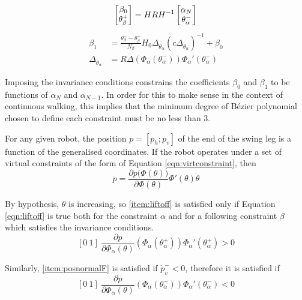 \begin{equation} \label{eqn:bezinvconfig}
	\begin{bmatrix}
	 \beta_0 \\ \theta_\beta^+
	\end{bmatrix}
	= HRH^{-1} \begin{bmatrix}
		\alpha_N \\ \theta_\alpha^-
	\end{bmatrix} \\
\end{equation}
\begin{subequations} \label{eqn:bezinvvel}
\begin{align}
	\beta_1 &= \frac{\theta_\beta^- - \theta_\beta^+}{N_\beta}
	H_0\Delta_{\dot{\theta}_\alpha} \left(c\Delta_{\dot{\theta}_\alpha}\right)^{-1} + \beta_0\\
	\Delta_{\dot{\theta}_\alpha} &= R\Delta\left(\Phi_\alpha\left(\theta_\alpha^-\right)\right)
		\Phi_\alpha'\left(\theta_\alpha^-\right)
\end{align}
\end{subequations}

Imposing the invariance conditions constrains the coefficients $\beta_0$ and $\beta_1$ to be functions of $\alpha_N$ and $\alpha_{N-1}$. In order for this to make sense in the context of continuous walking, this implies that the minimum degree of Bézier polynomial chosen to define each constraint must be no less than 3.

For any given robot, the position $p=[p_h;p_v]$ of the end of the swing leg is a function of the generalised coordinates. If the robot operates under a set of virtual constraints of the form of Equation \ref{eqn:virtconstraint}, then
\begin{equation*}
	\dot{p} = \frac{\partial p\Big(\Phi(\theta)\Big)}{\partial\Phi(\theta)}
	\Phi'(\theta)\dot{\theta}
\end{equation*}

By hypothesis, $\theta$ is increasing, so \ref{item:liftoff} is satisfied only if Equation \ref{eqn:liftoff} is true both for the constraint $\alpha$ and for a following constraint $\beta$ which satisfies the invariance conditions.
\begin{equation} \label{eqn:liftoff}
	[0~1]~\frac{\partial p}{\partial\Phi_\alpha(\theta)}
	\left(\Phi_\alpha\left(\theta_\alpha^+\right)\right)\Phi_\alpha'\left(\theta_\alpha^+\right)>0
\end{equation}

Similarly, \ref{item:posnormalF} is satisfied if $\dot{p}_v^- < 0$, therefore it is satisfied if
\begin{equation} \label{eqn:posnormalF}
	[0~1]~\frac{\partial p}{\partial\Phi_\alpha(\theta)}
	\left(\Phi_\alpha\left(\theta_\alpha^-\right)\right)\Phi_\alpha'\left(\theta_\alpha^-\right)<0
\end{equation}

